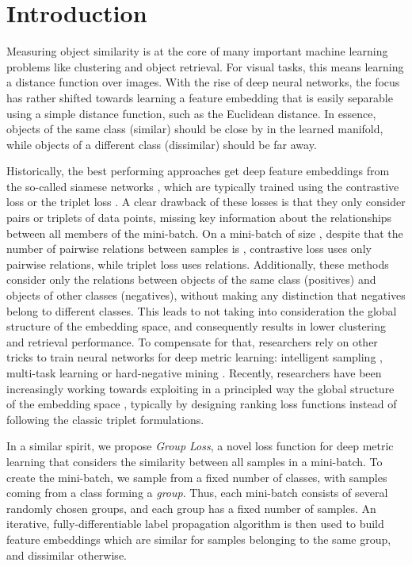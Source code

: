 \documentclass[runningheads]{llncs}
\begin{document}
\section{Introduction}
Measuring object similarity is at the core of many important machine learning problems like clustering and object retrieval. 
For visual tasks, this means learning a distance function over images. With the rise of deep neural networks, the focus has rather shifted towards learning a feature embedding that is easily separable using a simple distance function, such as the Euclidean distance. 
In essence, objects of the same class (similar) should be close by in the learned manifold, while objects of a different class (dissimilar) should be far away. 


Historically, the best performing approaches get deep feature embeddings from the so-called siamese networks \cite{bromley1994signature}, which are typically trained using the contrastive loss \cite{bromley1994signature} or the triplet loss \cite{DBLP:conf/nips/SchultzJ03,DBLP:journals/jmlr/WeinbergerS09}. 
A clear drawback of these losses is that they only consider pairs or triplets of data points, missing key information about the relationships between all members of the mini-batch. On a mini-batch of size , despite that the number of pairwise relations between samples is , contrastive loss uses only  pairwise relations, while triplet loss uses  relations.
Additionally, these methods consider only the relations between objects of the same class (positives) and objects of other classes (negatives), without making any distinction that negatives belong to different classes.
This leads to not taking into consideration the global structure of the embedding space, and consequently results in lower clustering and retrieval performance. 
To compensate for that, researchers rely on other tricks to train neural networks for deep metric learning: intelligent sampling \cite{DBLP:conf/iccv/ManmathaWSK17}, multi-task learning \cite{DBLP:conf/cvpr/ZhangZLZ16} or hard-negative mining \cite{DBLP:conf/cvpr/SchroffKP15}. 
Recently, researchers have been increasingly working towards exploiting in a principled way the global structure of the embedding space \cite{DBLP:journals/corr/abs-1906-07589,DBLP:conf/cvpr/Cakir0XKS19,DBLP:conf/cvpr/0003CBS18,DBLP:conf/cvpr/WangHKHGR19}, typically by designing ranking loss functions instead of following the classic triplet formulations.

In a similar spirit, we propose {\it Group Loss}, a novel loss function for deep metric learning that considers the similarity between all samples in a mini-batch. To create the mini-batch, we sample from a fixed number of classes, with samples coming from a class forming a \textit{group}. Thus, each mini-batch consists of several randomly chosen groups, and each group has a fixed number of samples. An iterative, fully-differentiable label propagation algorithm is then used to build feature embeddings which are similar for samples belonging to the same group, and dissimilar otherwise. 
\end{document}
